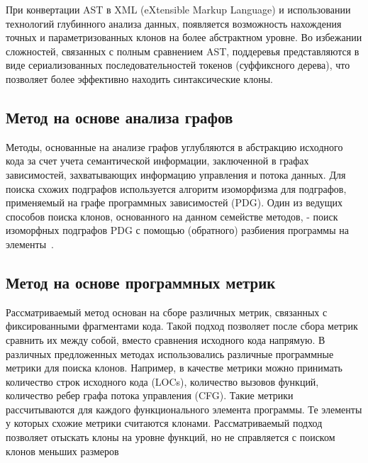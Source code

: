 При конвертации AST в XML (eXtensible Markup Language) и использовании технологий глубинного анализа данных, появляется возможность нахождения точных и параметризованных клонов на более абстрактном уровне. Во избежании сложностей, связанных с полным сравнением AST, поддеревья представляются в виде сериализованных последовательностей токенов (суффиксного дерева), что позволяет более эффективно находить синтаксические клоны.


\subsection{Метод на основе анализа графов}

Методы, основанные на анализе графов углубляются в абстракцию исходного кода за счет учета семантической информации, заключенной в графах зависимостей, захватывающих информацию управления и потока данных. Для поиска схожих подграфов используется алгоритм изоморфизма для подграфов, применяемый на графе программных зависимостей (PDG). Один из ведущих способов поиска клонов, основанного на данном семействе методов, - поиск изоморфных подграфов PDG с помощью (обратного) разбиения программы на элементы~\cite{PDGdetect}. 


\subsection{Метод на основе программных метрик}

Рассматриваемый метод основан на сборе различных метрик, связанных с фиксированными фрагментами кода. Такой подход позволяет после сбора метрик сравнить их между собой, вместо сравнения исходного кода напрямую. В различных предложенных методах использовались различные программные метрики для поиска клонов. Например, в качестве метрики можно принимать количество строк исходного кода (LOCs), количество вызовов функций, количество ребер графа потока управления (CFG). Такие метрики рассчитываются для каждого функционального элемента программы. Те элементы у которых схожие метрики считаются клонами. Рассматриваемый подход позволяет отыскать клоны на уровне функций, но не справляется с поиском клонов меньших размеров~\cite{2018art}


